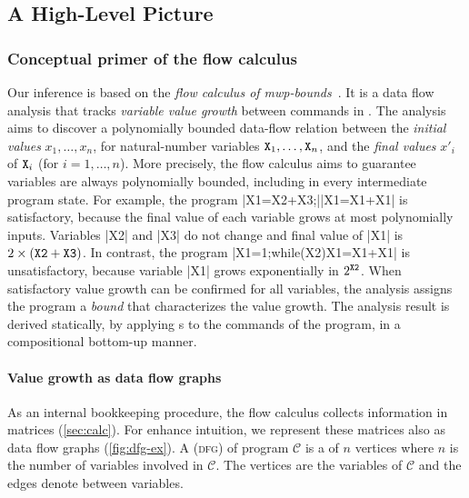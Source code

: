 \subsection{A High-Level Picture}
\label{sec:prelim}

\subsubsection{Conceptual primer of the flow calculus}
\label{subsec:flow-calc-intro}

Our  inference is based on the \emph{flow calculus of
mwp-bounds}~\cite{jones2009,aubert20222}. It is a data flow
analysis that tracks \emph{variable value growth} between commands in
. The analysis aims to discover a polynomially bounded
data-flow relation between the \emph{initial values}
\(x_1,\ldots,x_n\), for natural-number variables
\(\prm{X}_1,\ldots,\prm{X}_n\), and the \emph{final values}
\(x'_i\) of \(\prm{X}_i\) (for \(i=1,\ldots,n\)).
More precisely, the flow calculus aims to guarantee variables are always
polynomially bounded, including in every intermediate program state. For
example, the program \pr|X1=X2+X3;|\pr|X1=X1+X1| is satisfactory, because the
final value of each variable grows at most polynomially \wrt inputs. Variables
\pr|X2| and \pr|X3| do not change and final value of \pr|X1| is \(2 \times
(\prm{X2} + \prm{X3})\). In contrast, the program \pr|X1=1;while(X2){X1=X1+X1}|
is unsatisfactory, because variable \pr|X1| grows exponentially in
\(2^{\prm{X2}}\). When satisfactory value growth can be confirmed for all
variables, the analysis assigns the program a \emph{bound} that characterizes
the value growth. The analysis result is derived statically, by applying
s to the commands of the program, in a
compositional bottom-up manner.

\paragraph*{Value growth as data flow graphs}
As an internal bookkeeping procedure, the flow calculus collects information in
matrices (\autoref{sec:calc}). For enhance intuition, we represent these
matrices also as data flow graphs (\autoref{fig:dfg-ex}). A \emph{} (\textsc{dfg}) of program \(\mathcal{C}\) is a
 of \(n\) vertices where \(n\) is the number of variables
involved in \(\mathcal{C}\). The vertices are the variables of
\(\mathcal{C}\) and the edges denote  between
variables.

